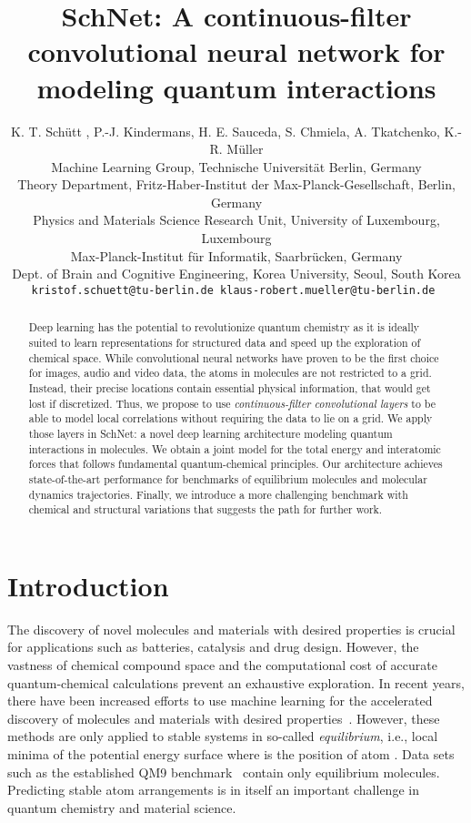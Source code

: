 \documentclass{article}
\title{SchNet: A continuous-filter convolutional neural network for modeling quantum interactions}
\author{
  K. T. Schütt ,
  P.-J. Kindermans,
  H. E. Sauceda,
  S. Chmiela,
  A. Tkatchenko,
  K.-R. Müller\footnotemark \\
   Machine Learning Group, Technische Universität Berlin, Germany \\
   Theory Department, Fritz-Haber-Institut der Max-Planck-Gesellschaft, Berlin, Germany\\
   Physics and Materials Science Research Unit, University of Luxembourg, Luxembourg\\
   Max-Planck-Institut für Informatik, Saarbrücken, Germany\\
   Dept. of Brain and Cognitive Engineering, Korea University, Seoul, South Korea\\
   \tt{kristof.schuett@tu-berlin.de}
  \tt{klaus-robert.mueller@tu-berlin.de}
}
\begin{document}
\maketitle


\begin{abstract}
Deep learning has the potential to revolutionize quantum chemistry as it is ideally suited to learn representations for structured data and speed up the exploration of chemical space.
While convolutional neural networks have proven to be the first choice for images, audio and video data, the atoms in molecules are not restricted to a grid.
Instead, their precise locations contain essential physical information, that would get lost if discretized.
Thus, we propose to use \textit{continuous-filter convolutional layers} to be able to model local correlations without requiring the data to lie on a grid.
We apply those layers in SchNet: a novel deep learning architecture modeling quantum interactions in molecules.
We obtain a joint model for the total energy and interatomic forces that follows fundamental quantum-chemical principles.
Our architecture achieves state-of-the-art performance for benchmarks of equilibrium molecules and molecular dynamics trajectories.
Finally, we introduce a more challenging benchmark with chemical and structural variations that suggests the path for further work.




\end{abstract}

\section{Introduction}

The discovery of novel molecules and materials with desired properties is crucial for applications such as batteries, catalysis and drug design.
However, the vastness of chemical compound space and the computational cost of accurate quantum-chemical calculations prevent an exhaustive exploration.
In recent years, there have been increased efforts to use machine learning for the accelerated discovery of molecules and materials with desired properties~\citep{rupp2012fast,montavon2013machine,hansen2013assessment,schutt2014represent,Hansen-JCPL,faber2017fast,brockherde2017bypassing,boomsma2017spherical,eickenberg2017scattering}.
However, these methods are only applied to stable systems in so-called \emph{equilibrium}, i.e., local minima of the potential energy surface  where  is the position of atom .
Data sets such as the established QM9 benchmark~\citep{ramakrishnan2014quantum} contain only equilibrium molecules.
Predicting stable atom arrangements is in itself an important challenge in quantum chemistry and material science.
\end{document}
